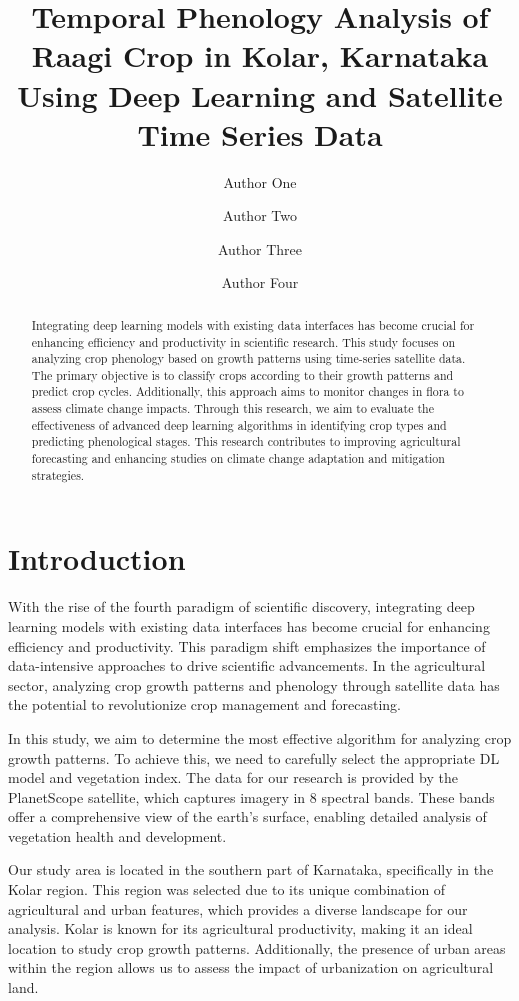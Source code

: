 \documentclass{article}
\title
{Temporal Phenology Analysis of Raagi Crop in Kolar, Karnataka Using Deep Learning and Satellite Time Series Data}
\author[1*$\dag$]{Author One}
\author[2$\dag$]{Author Two}
\author[2]{Author Three}
\author[1,2]{Author Four}
\affil[1]{Department of Physics, A University, City, Country.}
\affil[2]{Department of Astronomy, B University, City, Country.}
\affil[*]{Address correspondence to: email@email.com}
\affil[$\dag$]{These authors contributed equally to this work.}
\date{}
\begin{document}
\maketitle

\begin{abstract}
Integrating deep learning models with existing data interfaces has become crucial for enhancing efficiency and productivity in scientific research. This study focuses on analyzing crop phenology based on growth patterns using time-series satellite data. The primary objective is to classify crops according to their growth patterns and predict crop cycles. Additionally, this approach aims to monitor changes in flora to assess climate change impacts. Through this research, we aim to evaluate the effectiveness of advanced deep learning algorithms in identifying crop types and predicting phenological stages. This research contributes to improving agricultural forecasting and enhancing studies on climate change adaptation and mitigation strategies.
\end{abstract}


\section{Introduction}
With the rise of the fourth paradigm of scientific discovery, integrating deep learning  models with existing data interfaces has become crucial for enhancing efficiency and productivity. This paradigm shift emphasizes the importance of data-intensive approaches to drive scientific advancements. In the agricultural sector, analyzing crop growth patterns and phenology through satellite data has the potential to revolutionize crop management and forecasting.

In this study, we aim to determine the most effective algorithm for analyzing crop growth patterns. To achieve this, we need to carefully select the appropriate DL model and vegetation index. The data for our research is provided by the PlanetScope satellite, which captures imagery in 8 spectral bands. These bands offer a comprehensive view of the earth’s surface, enabling detailed analysis of vegetation health and development.

Our study area is located in the southern part of Karnataka, specifically in the Kolar region. This region was selected due to its unique combination of agricultural and urban features, which provides a diverse landscape for our analysis. Kolar is known for its agricultural productivity, making it an ideal location to study crop growth patterns. Additionally, the presence of urban areas within the region allows us to assess the impact of urbanization on agricultural land.
\end{document}
